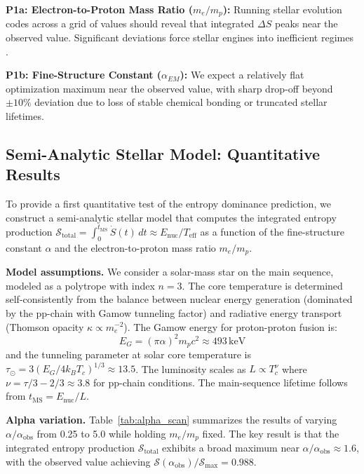 \documentclass[12pt,a4paper]{article}
\theoremstyle{remark}
\begin{document}
\textbf{P1a: Electron-to-Proton Mass Ratio ($m_e/m_p$):} Running stellar evolution codes across a grid of values should reveal that integrated $\Delta S$ peaks near the observed value. Significant deviations force stellar engines into inefficient regimes \citep{Adams2019}.

\textbf{P1b: Fine-Structure Constant ($\alpha_{EM}$):} We expect a relatively flat optimization maximum near the observed value, with sharp drop-off beyond $\pm 10\%$ deviation due to loss of stable chemical bonding or truncated stellar lifetimes.

\subsection{Semi-Analytic Stellar Model: Quantitative Results}
\label{sec:stellar_model}

To provide a first quantitative test of the entropy dominance prediction, we construct a semi-analytic stellar model that computes the integrated entropy production $\mathcal{S}_{\text{total}} = \int_0^{t_{\text{MS}}} \dot{S}(t)\,dt \approx E_{\text{nuc}} / T_{\text{eff}}$ as a function of the fine-structure constant $\alpha$ and the electron-to-proton mass ratio $m_e/m_p$.

\textbf{Model assumptions.} We consider a solar-mass star on the main sequence, modeled as a polytrope with index $n = 3$. The core temperature is determined self-consistently from the balance between nuclear energy generation (dominated by the pp-chain with Gamow tunneling factor) and radiative energy transport (Thomson opacity $\kappa \propto m_e^{-2}$). The Gamow energy for proton-proton fusion is:
\begin{equation}
E_G = (\pi \alpha)^2 m_p c^2 \approx 493\,\text{keV}
\end{equation}
and the tunneling parameter at solar core temperature is $\tau_\odot = 3(E_G / 4 k_B T_c)^{1/3} \approx 13.5$. The luminosity scales as $L \propto T_c^{\nu}$ where $\nu = \tau/3 - 2/3 \approx 3.8$ for pp-chain conditions. The main-sequence lifetime follows from $t_{\text{MS}} = E_{\text{nuc}} / L$.

\textbf{Alpha variation.} Table~\ref{tab:alpha_scan} summarizes the results of varying $\alpha / \alpha_{\text{obs}}$ from 0.25 to 5.0 while holding $m_e/m_p$ fixed. The key result is that the integrated entropy production $\mathcal{S}_{\text{total}}$ exhibits a broad maximum near $\alpha / \alpha_{\text{obs}} \approx 1.6$, with the observed value achieving $\mathcal{S}(\alpha_{\text{obs}}) / \mathcal{S}_{\text{max}} = 0.988$.
\end{document}
